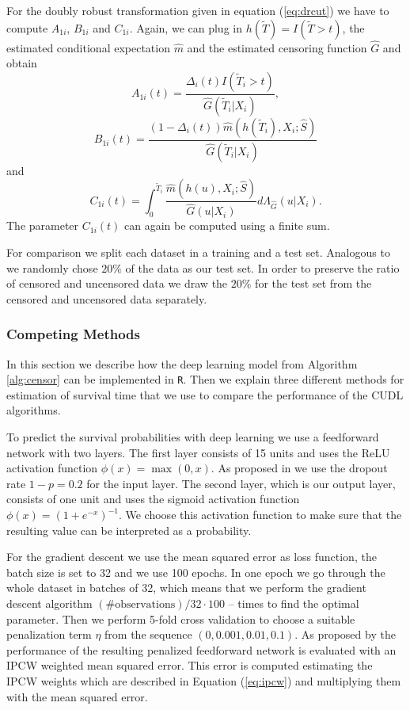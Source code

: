 \documentclass[12pt, a4paper]{scrartcl}
\theoremstyle{definition}
\theoremstyle{plain}
\numberwithin{equation}{section}
\numberwithin{figure}{section}
\numberwithin{table}{section}
\begin{document}
	For the doubly robust transformation given in equation (\ref{eq:drcut}) we have to compute $A_{1i}$, $B_{1i}$ and $C_{1i}$.
	Again, we can plug in $h(\tilde T)=I(\tilde T>t)$, the estimated conditional expectation $\hat{m}$ and the estimated censoring function $\hat{G}$ and obtain
	\begin{equation*}
		A_{1i}(t)=\frac{\Delta_i(t)I(\tilde{T}_i >t)}{\hat{G}(\tilde{T}_i\vert X_i)},
	\end{equation*}
	\begin{equation*}
		B_{1i}(t) = \frac{(1-\Delta_i(t))\hat{m}(h(\tilde{T}_i), X_i; \hat{S})}{\hat{G}(\tilde{T}_i \vert X_i)}
	\end{equation*}
	and
	\begin{equation*}
	C_{1i}(t) = \int_{0}^{\tilde T_i}\frac{\hat{m}(h(u), X_i; \hat{S})}{\hat{G}(u\vert X_i)}d\Lambda_{\hat{G}}(u \vert X_i).
	\end{equation*}
	The parameter $C_{1i}(t)$ can again be computed using a finite sum.
	
	For comparison we split each dataset in a training and a test set.
	Analogous to \citet*{basearticle} we randomly chose $20\%$ of the data as our test set.
	In order to preserve the ratio of censored and uncensored data we draw the $20\%$ for the test set from the censored and uncensored data separately.
	
	\subsubsection{Competing Methods}\label{comp}
	
	In this section we describe how the deep learning model from Algorithm \ref{alg:censor} can be implemented in \texttt{R}.
	Then we explain three different methods for estimation of survival time that we use to compare the performance of the CUDL algorithms.
	
	To predict the survival probabilities with deep learning we use a feedforward network with two layers.
	The first layer consists of 15 units and uses the ReLU activation function $\phi(x) = \max(0, x)$.
	As proposed in \citet*{deeplbook} we use the dropout rate $1-p=0.2$ for the input layer.
	The second layer, which is our output layer, consists of one unit and uses the sigmoid activation function $\phi(x)=(1+e^{-x})^{-1}$.
	We choose this activation function to make sure that the resulting value can be interpreted as a probability.
	
	For the gradient descent we use the mean squared error as loss function, the batch size is set to 32 and we use 100 epochs.
	In one epoch we go through the whole dataset in batches of 32, which means that we perform the gradient descent algorithm $(\# \text{observations})/32\cdot100$ -- times to find the optimal parameter.
	Then we perform 5-fold cross validation to choose a suitable penalization term $\eta$ from the sequence $(0, 0.001, 0.01, 0.1)$.
	As proposed by \citet*{basearticle} the performance of the resulting penalized feedforward network is evaluated with an IPCW weighted mean squared error.
	This error is computed estimating the IPCW weights which are described in Equation (\ref{eq:ipcw}) and multiplying them with the mean squared error.
	
\end{document}
